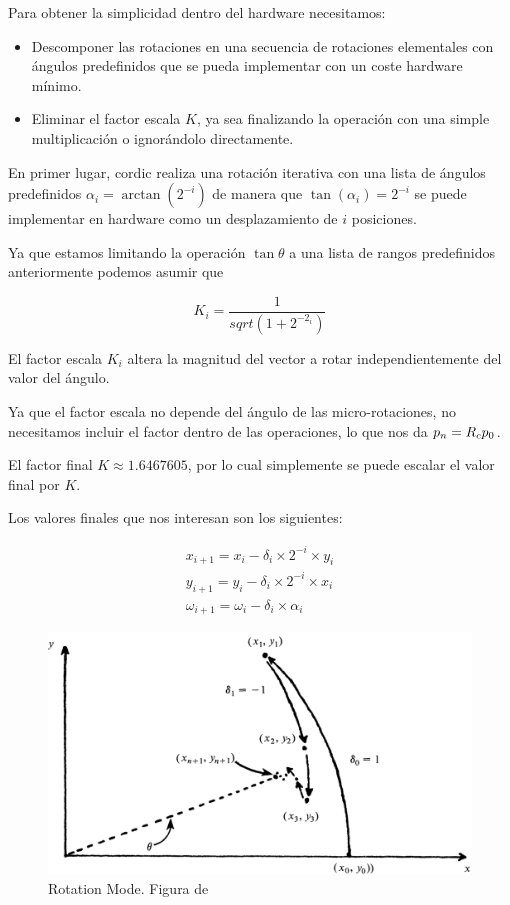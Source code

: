 Para obtener la simplicidad dentro del hardware necesitamos:

\begin{itemize}
	\item Descomponer las rotaciones en una secuencia de rotaciones elementales con ángulos predefinidos que se pueda implementar con un coste hardware mínimo.
	\item Eliminar el factor escala $K$, ya sea finalizando la operación con una simple multiplicación o ignorándolo directamente.
\end{itemize}

En primer lugar, \gls{cordic} realiza una rotación iterativa con una lista de ángulos predefinidos $\alpha_{i} = \arctan({2^{-i}})$ de manera que $\tan({\alpha_{i}}) = 2^{-i}$ se puede implementar en hardware como un desplazamiento de $i$ posiciones.

Ya que estamos limitando la operación $\tan{\theta}$ a una lista de rangos predefinidos anteriormente podemos asumir que

\[
	K_{i} = \frac{1}{sqrt{(1+2^{-2_{i}})}}
\]

El factor escala $K_{i}$ altera la magnitud del vector a rotar independientemente del valor del ángulo. 

Ya que el factor escala no depende del ángulo de las micro-rotaciones, no necesitamos incluir el factor dentro de las operaciones, lo que nos da $\boldmath{p_{n} = R_{c}p_{0}}$.

El factor final $K \approx 1.6467605$, por lo cual simplemente se puede escalar el valor final por $K$.

Los valores finales que nos interesan son los siguientes:

\[
\begin{matrix}
	x_{i+1} = x_{i} - \delta_{i} \times 2^{-i} \times y_{i} \\
	y_{i+1} = y_{i} - \delta_{i} \times 2^{-i} \times x_{i} \\
	\omega_{i+1} =  \omega_{i} - \delta_{i} \times \alpha_{i}
\end{matrix}
\]

\begin{figure}[ht]
	\centering
	\includegraphics[width=\textwidth]{archivos/CORDIC/RotationMode.png}
	\caption{Rotation Mode. Figura de \cite{schelin_calculator_1983}}
	\label{graf:RM}
\end{figure}

